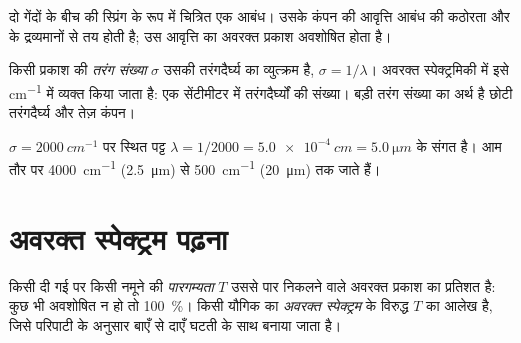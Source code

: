 \begin{omfigure}

{\small दो गेंदों के बीच की स्प्रिंग के रूप में चित्रित एक आबंध। उसके कंपन की
आवृत्ति आबंध की कठोरता और  के द्रव्यमानों से तय होती है;
उस आवृत्ति का अवरक्त प्रकाश अवशोषित होता है।}
\end{omfigure}

\begin{definition}[तरंग संख्या]\label{def:g11:infrared:wavenumber}
किसी प्रकाश की \emph{तरंग संख्या} $\sigma$ उसकी तरंगदैर्घ्य
का व्युत्क्रम है, $\sigma = 1/\lambda$। अवरक्त स्पेक्ट्रमिकी में
इसे \si{cm^{-1}} में व्यक्त किया जाता है: एक सेंटीमीटर में तरंगदैर्घ्यों की संख्या।
बड़ी तरंग संख्या का अर्थ है छोटी तरंगदैर्घ्य और
तेज़ कंपन।
\end{definition}

\begin{example}[तरंग संख्या से तरंगदैर्घ्य तक]\label{ex:g11:infrared:convert}
$\sigma = \qty{2000}{cm^{-1}}$ पर स्थित पट्ट
$\lambda = 1/2000 = \qty{5.0e-4}{cm} = \qty{5.0}{\micro m}$ के संगत है।  आम तौर पर \qty{4000}{cm^{-1}} (\qty{2.5}{\micro m}) से
\qty{500}{cm^{-1}} (\qty{20}{\micro m}) तक जाते हैं।
\end{example}

\section{अवरक्त स्पेक्ट्रम पढ़ना}

\begin{definition}\label{def:g11:infrared:spectrum}
किसी दी गई  पर किसी नमूने की \emph{पारगम्यता} $T$
उससे पार निकलने वाले अवरक्त प्रकाश का प्रतिशत है: कुछ भी अवशोषित न हो
तो \qty{100}{\percent}। किसी यौगिक का \emph{अवरक्त
स्पेक्ट्रम}  के विरुद्ध $T$ का आलेख है,
जिसे परिपाटी के अनुसार बाएँ से दाएँ घटती  के साथ
बनाया जाता है।
\end{definition}

